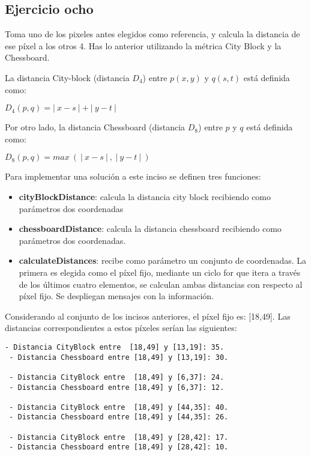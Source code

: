 \documentclass[
  journal=largetwo,
  manuscript=Practica-Dos,
  year=2024-1, %
  volume=37,
  spanish, %
]{cup-journal}
\begin{document}
\subsection{Ejercicio ocho}

Toma uno de los pixeles antes elegidos como referencia, y calcula la distancia de ese píxel a los otros 4. Has lo anterior utilizando la métrica City Block y la Chessboard.

La distancia City-block (distancia $D_4$) entre $p\left(x,y\right)$ y $q\left(s,t\right)$ está definida como: 


\begin{center}
    $D_4\left(p,q\right)=|\:x-s\:|+|\:y-t\:|\:$
\end{center}

Por otro lado, la distancia Chessboard (distancia $D_8$) entre $p$ y $q$ está definida como: 

\begin{center}
    $D_8\left(p,q\right)=max\:\left(\:|\:x-s\:|\:,\:|\:y-t\:|\:\right)\:$
\end{center}

Para implementar una solución a este inciso se definen tres funciones: 

\begin{itemize}
    \item \textbf{cityBlockDistance}: calcula la distancia city block recibiendo como parámetros dos coordenadas
    \item \textbf{chessboardDistance}: calcula la distancia chessboard recibiendo como parámetros dos coordenadas. 
    \item \textbf{calculateDistances}: recibe como parámetro un conjunto de coordenadas. La primera es elegida como el píxel fijo, mediante un ciclo for que itera a través de los últimos cuatro elementos, se calculan ambas distancias con respecto al píxel fijo. Se despliegan mensajes con la información. 
\end{itemize}

Considerando al conjunto de los incisos anteriores, el píxel fijo es: [18,49]. Las distancias correspondientes a estos píxeles serían las siguientes: 

\begin{lstlisting}[style=Matlab-editor, caption=MATLAB Code Example, basicstyle=\fontsize{8}{12}\selectfont]
 - Distancia CityBlock entre  [18,49] y [13,19]: 35.
 - Distancia Chessboard entre [18,49] y [13,19]: 30.
 
 - Distancia CityBlock entre  [18,49] y [6,37]: 24.
 - Distancia Chessboard entre [18,49] y [6,37]: 12.
 
 - Distancia CityBlock entre  [18,49] y [44,35]: 40.
 - Distancia Chessboard entre [18,49] y [44,35]: 26.
 
 - Distancia CityBlock entre  [18,49] y [28,42]: 17.
 - Distancia Chessboard entre [18,49] y [28,42]: 10.
\end{lstlisting}
\end{document}
